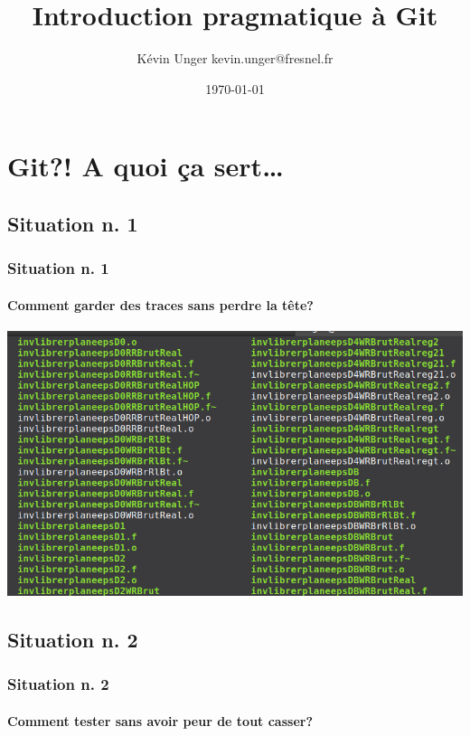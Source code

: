 \documentclass[t,11pt]{beamer}
\title{Introduction pragmatique à Git}
\author{K\'evin Unger\hspace{1mm} \newline kevin.unger@fresnel.fr}
\institute
{
        Institut Fresnel\\
        \url{https://github.com/kevung/git-presentation.git}
}
\date{\today}
\begin{document}
\begin{frame}[plain,c]
        \titlepage
\end{frame}

\begin{frame}[c]
        \tableofcontents[hideallsubsections]
\end{frame}


\section{Git?! A quoi ça sert\ldots}


\subsection{Situation n. 1}
\begin{frame}[label=sit1]
        \frametitle{Situation n. 1}
        \framesubtitle{Comment garder des traces sans perdre la tête?}
        \includegraphics[width=\linewidth]{./img/bazar_crop2}
\end{frame}


\subsection{Situation n. 2}
\begin{frame}[label=sit2]
        \frametitle{Situation n. 2}
        \framesubtitle{Comment tester sans avoir peur de tout casser?}
\end{frame}
\end{document}
